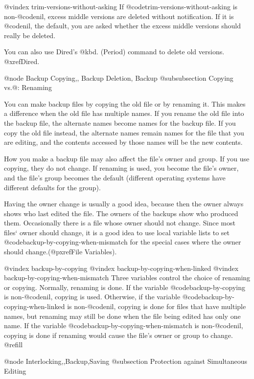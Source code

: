 {{{{{{{{{{{{{{{{{@vindex trim-versions-without-asking
  If @code{trim-versions-without-asking} is non-@code{nil},  excess
middle versions are deleted without notification.  If it is @code{nil}, the
default, you are asked whether the excess middle versions should
really be deleted.

  You can also use Dired's @kbd{.} (Period) command to delete old versions.
@xref{Dired}.

@node Backup Copying,, Backup Deletion, Backup
@subsubsection Copying vs.@: Renaming

  You can make backup files by copying the old file or by renaming it.
This makes a difference when the old file has multiple names.  If you
rename the old file into the backup file, the alternate names
become names for the backup file.  If you copy the old file instead,
the alternate names remain names for the file that you are editing,
and the contents accessed by those names will be the new contents.

  How you make a backup file may also affect the file's owner
and group.  If you use copying, they do not change.  If renaming is used,
you become the file's owner, and the file's group becomes the default
(different operating systems have different defaults for the group).

  Having the owner change is usually a good idea, because then the owner
always shows who last edited the file.  The owners of the backups show
who produced them.  Occasionally there is a file whose owner should not
change.  Since most files` owner should change, it is a good idea to use
local variable lists to set @code{backup-by-copying-when-mismatch} for
the special cases where the owner should change.(@pxref{File
Variables}).

@vindex backup-by-copying
@vindex backup-by-copying-when-linked
@vindex backup-by-copying-when-mismatch
  Three variables control the choice of renaming or copying.
Normally, renaming is done.  If the variable @code{backup-by-copying} is
non-@code{nil}, copying is used.  Otherwise, if the variable
@code{backup-by-copying-when-linked} is non-@code{nil}, copying is
done for files that have multiple names, but renaming may still be done when
the file being edited has only one name.  If the variable
@code{backup-by-copying-when-mismatch} is non-@code{nil}, copying is
done if renaming would cause the file's owner or group to change.  @refill

@node Interlocking,,Backup,Saving
@subsection Protection against Simultaneous Editing

}}}}}}}}}}}}}}}}}
